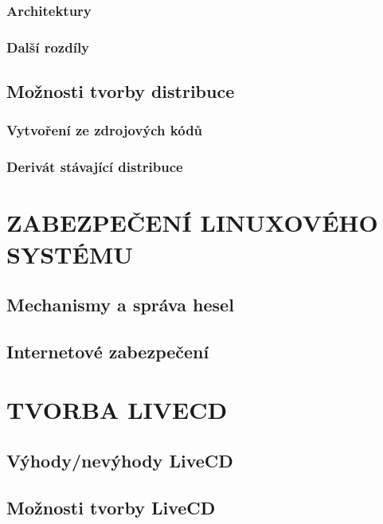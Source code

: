 \documentclass[a4paper,12pt]{article}
\newcommand{\sectionV}[1]{\section{\uppercase{#1}}}	%
\renewcommand{\part}[1]{
	\refstepcounter{part}
	\addcontentsline{toc}{section}{\thepart~~\uppercase{#1}}%
\clearpage
\normalfont
	\vspace*{9cm}
	\begin{center}\huge \bfseries\thepart. \uppercase{#1}\end{center}%
	\markboth{}{}\par
\nobreak
\clearpage	
}
\begin{document}
\subsubsection{Architektury}

\subsubsection{Další rozdíly}

\subsection{Možnosti tvorby distribuce}
\subsubsection{Vytvoření ze zdrojových kódů}
\subsubsection{Derivát stávající distribuce}

\sectionV{Zabezpečení Linuxového systému}
\subsection{Mechanismy a správa hesel}
\subsection{Internetové zabezpečení}

\sectionV{Tvorba LiveCD}
\subsection{Výhody/nevýhody LiveCD}
\subsection{Možnosti tvorby LiveCD}


\end{document}
